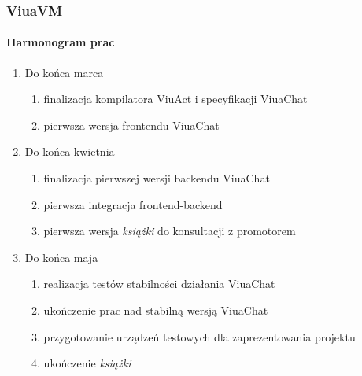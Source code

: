 \documentclass{beamer}
\begin{document}
\begin{frame}
    \frametitle{ViuaVM}
    \framesubtitle{Harmonogram prac}

    \begin{enumerate}
        \item Do końca marca
        \begin{enumerate}
        	\item finalizacja kompilatora ViuAct i specyfikacji ViuaChat
        	\item pierwsza wersja frontendu ViuaChat
        \end{enumerate}         
        \item Do końca kwietnia
        \begin{enumerate}
        	\item finalizacja pierwszej wersji backendu ViuaChat
        	\item pierwsza integracja frontend-backend
        	\item pierwsza wersja \textit{książki} do konsultacji z promotorem
        \end{enumerate}
        \item Do końca maja
        \begin{enumerate}
        	\item realizacja testów stabilności działania ViuaChat
        	\item ukończenie prac nad stabilną wersją ViuaChat
        	\item przygotowanie urządzeń testowych dla zaprezentowania projektu
        	\item ukończenie \textit{książki}
        \end{enumerate}
    \end{enumerate}
\end{frame}
\end{document}
